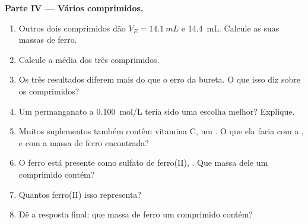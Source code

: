\begin{problem}
\medskip
\noindent\textbf{Parte IV --- Vários comprimidos.}
\begin{enumerate}[resume]
  \item Outros dois comprimidos dão $V_E = \qty{14.1}{mL}$ e
        \qty{14.4}{mL}. Calcule as suas massas de ferro.
  \item Calcule a média dos três comprimidos.
  \item Os três resultados diferem mais do que o erro da bureta. O que
        isso diz sobre os comprimidos?
  \item Um permanganato a \qty{0.100}{mol/L} teria sido uma escolha
        melhor? Explique.
  \item Muitos suplementos também contêm vitamina C, um . O que
        ela faria com a , e com a massa de ferro encontrada?
  \item O ferro está presente como sulfato de ferro(II), . Que
        massa dele um comprimido contém?
  \item Quantos  ferro(II) isso representa?
  \item Dê a resposta final: que massa de ferro um comprimido contém?
\end{enumerate}
\end{problem}
